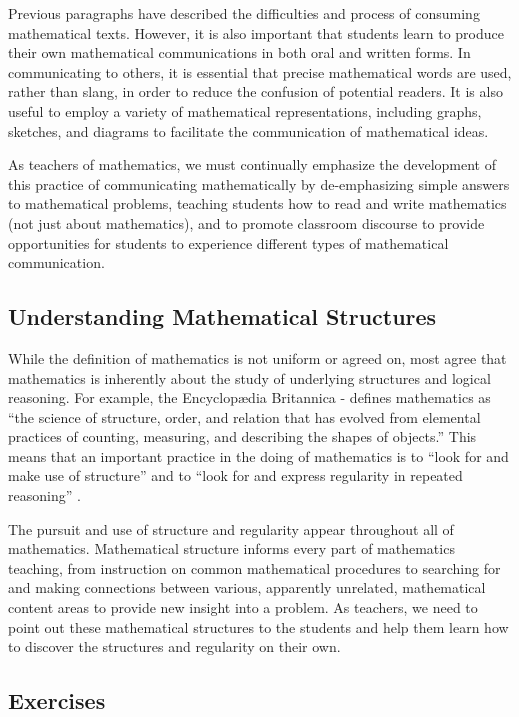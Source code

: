 \documentclass[
]{book}
\theoremstyle{definition}
\theoremstyle{definition}
\theoremstyle{definition}
\theoremstyle{definition}
\theoremstyle{remark}
\begin{document}
Previous paragraphs have described the difficulties and process of consuming mathematical texts. However, it is also important that students learn to produce their own mathematical communications in both oral and written forms. In communicating to others, it is essential that precise mathematical words are used, rather than slang, in order to reduce the confusion of potential readers. It is also useful to employ a variety of mathematical representations, including graphs, sketches, and diagrams to facilitate the communication of mathematical ideas.

As teachers of mathematics, we must continually emphasize the development of this practice of communicating mathematically by de-emphasizing simple answers to mathematical problems, teaching students how to read and write mathematics (not just about mathematics), and to promote classroom discourse to provide opportunities for students to experience different types of mathematical communication.

\hypertarget{understanding-mathematical-structures}{%
\subsection{Understanding Mathematical Structures}\label{understanding-mathematical-structures}}

While the definition of mathematics is not uniform or agreed on, most agree that mathematics is inherently about the study of underlying structures and logical reasoning. For example, the Encyclopædia Britannica -\citet{definition} defines mathematics as ``the science of structure, order, and relation that has evolved from elemental practices of counting, measuring, and describing the shapes of objects.'' This means that an important practice in the doing of mathematics is to ``look for and make use of structure'' and to ``look for and express regularity in repeated reasoning'' \citep{CCSS}.

The pursuit and use of structure and regularity appear throughout all of mathematics. Mathematical structure informs every part of mathematics teaching, from instruction on common mathematical procedures to searching for and making connections between various, apparently unrelated, mathematical content areas to provide new insight into a problem. As teachers, we need to point out these mathematical structures to the students and help them learn how to discover the structures and regularity on their own.

\hypertarget{exercises-1}{%
\subsection{Exercises}\label{exercises-1}}
\end{document}
